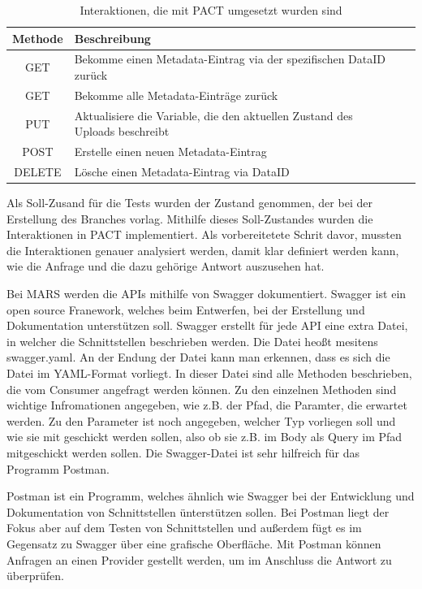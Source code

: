 \documentclass{llncs}
\begin{document}
\begin{table}[htbp]
\centering
\begin{tabular}{|c|l|p{4cm}|p{4cm}|}
\hline
\multicolumn{1}{|l|}{Methode} & Beschreibung \\ \hline
GET & Bekomme einen Metadata-Eintrag via der spezifischen DataID zurück\\ \hline
GET & Bekomme alle Metadata-Einträge zurück \\ \hline
PUT & Aktualisiere die Variable, die den aktuellen Zustand des Uploads beschreibt \\ \hline
POST & Erstelle einen neuen Metadata-Eintrag \\ \hline
DELETE & Lösche einen Metadata-Eintrag via DataID\\ \hline
\end{tabular}
\caption{Interaktionen, die mit PACT umgesetzt wurden sind}
\label{tab:Interaktionen_PACT}
\end{table}

Als Soll-Zusand für die Tests wurden der Zustand genommen, der bei der Erstellung des Branches vorlag. Mithilfe dieses Soll-Zustandes wurden die Interaktionen in PACT implementiert. Als vorbereitetete Schrit davor, mussten die Interaktionen genauer analysiert werden, damit klar definiert werden kann, wie die Anfrage und die dazu gehörige Antwort auszusehen hat.

Bei MARS werden die APIs mithilfe von Swagger\citep{swagger} dokumentiert. Swagger ist ein open source Franework, welches beim Entwerfen, bei der Erstellung und Dokumentation unterstützen soll. Swagger erstellt für jede API eine extra Datei, in welcher die Schnittstellen beschrieben werden. Die Datei heoßt mesitens swagger.yaml. An der Endung der Datei kann man erkennen, dass es sich die Datei im YAML-Format vorliegt. In dieser Datei sind alle Methoden beschrieben, die vom Consumer angefragt werden können. Zu den einzelnen Methoden sind wichtige Infromationen angegeben, wie z.B. der Pfad, die Paramter, die erwartet werden. Zu den Parameter ist noch angegeben, welcher Typ vorliegen soll und wie sie mit geschickt werden sollen, also ob sie z.B. im Body als Query im Pfad mitgeschickt werden sollen. Die Swagger-Datei ist sehr hilfreich für das Programm Postman.

Postman ist ein Programm, welches ähnlich wie Swagger bei der Entwicklung und Dokumentation von Schnittstellen ünterstützen sollen. Bei Postman liegt der Fokus aber auf dem Testen von Schnittstellen und außerdem fügt es im Gegensatz zu Swagger über eine grafische Oberfläche. Mit Postman können Anfragen an einen Provider gestellt werden, um im Anschluss die Antwort zu überprüfen. 
\end{document}
